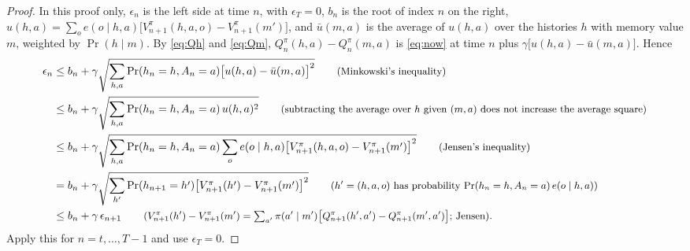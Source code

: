 \documentclass{article}
\theoremstyle{definition}
\newcommand{\why}[1]{\tag*{\small(#1)}}
\begin{document}
\begin{proof}
In this proof only, $\epsilon_n$ is the left side at time $n$, with $\epsilon_T=0$, $b_n$ is the root of index $n$ on the right, $u(h,a)=\sum_oe(o\mid h,a)\big[V^\pi_{n+1}(h,a,o)-V^\pi_{n+1}(m')\big]$, and $\bar u(m,a)$ is the average of $u(h,a)$ over the histories $h$ with memory value $m$, weighted by $\Pr(h\mid m)$. By \eqref{eq:Qh} and \eqref{eq:Qm}, $Q^\pi_n(h,a)-Q^\pi_n(m,a)$ is \eqref{eq:now} at time $n$ plus $\gamma\big[u(h,a)-\bar u(m,a)\big]$. Hence
\begin{align*}
\epsilon_n&\le b_n+\gamma\sqrt{\sum_{h,a}\Pr(h_n=h,A_n=a)\big[u(h,a)-\bar u(m,a)\big]^2} \why{Minkowski's inequality}\\
&\le b_n+\gamma\sqrt{\sum_{h,a}\Pr(h_n=h,A_n=a)\,u(h,a)^2} \why{subtracting the average over $h$ given $(m,a)$ does not increase the average square}\\
&\le b_n+\gamma\sqrt{\sum_{h,a}\Pr(h_n=h,A_n=a)\sum_oe(o\mid h,a)\big[V^\pi_{n+1}(h,a,o)-V^\pi_{n+1}(m')\big]^2} \why{Jensen's inequality}\\
&=b_n+\gamma\sqrt{\sum_{h'}\Pr(h_{n+1}=h')\big[V^\pi_{n+1}(h')-V^\pi_{n+1}(m')\big]^2} \why{$h'=(h,a,o)$ has probability $\Pr(h_n=h,A_n=a)\,e(o\mid h,a)$}\\
&\le b_n+\gamma\,\epsilon_{n+1} \why{$V^\pi_{n+1}(h')-V^\pi_{n+1}(m')=\sum_{a'}\pi(a'\mid m')\big[Q^\pi_{n+1}(h',a')-Q^\pi_{n+1}(m',a')\big]$; Jensen}.
\end{align*}
Apply this for $n=t,\dots,T-1$ and use $\epsilon_T=0$.
\end{proof}
\end{document}
